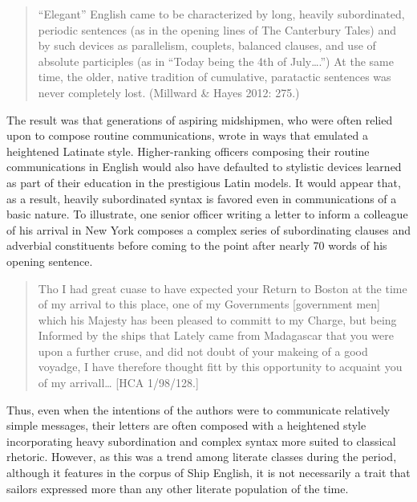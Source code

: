 \begin{quotation}
“Elegant” English came to be characterized by long, heavily subordinated, periodic sentences (as in the opening lines of The Canterbury Tales) and by such devices as parallelism, couplets, balanced clauses, and use of absolute participles (as in “Today being the 4th of July….”) At the same time, the older, native tradition of cumulative, paratactic sentences was never completely lost. (Millward \& Hayes 2012: 275.)

\end{quotation}
\begin{styleStandard}
The result was that generations of aspiring midshipmen, who were often relied upon to compose routine communications, wrote in ways that emulated a heightened Latinate style. Higher-ranking officers composing their routine communications in English would also have defaulted to stylistic devices learned as part of their education in the prestigious Latin models. It would appear that, as a result, heavily subordinated syntax is favored even in communications of a basic nature. To illustrate, one senior officer writing a letter to inform a colleague of his arrival in New York composes a complex series of subordinating clauses and adverbial constituents before coming to the point after nearly 70 words of his opening sentence.
\end{styleStandard}


\begin{quotation}
Tho I had great cuase to have expected your Return to Boston at the time of my arrival to this place, one of my Governments [government men] which his Majesty has been pleased to committ to my Charge, but being Informed by the ships that Lately came from Madagascar that you were upon a further cruse, and did not doubt of your makeing of a good voyadge, I have therefore thought fitt by this opportunity to acquaint you of my arrivall… [HCA 1/98/128.]

\end{quotation}
\begin{styleStandard}
Thus, even when the intentions of the authors were to communicate relatively simple messages, their letters are often composed with a heightened style incorporating heavy subordination and complex syntax more suited to classical rhetoric. However, as this was a trend among literate classes during the period, although it features in the corpus of Ship English, it is not necessarily a trait that sailors expressed more than any other literate population of the time. 
\end{styleStandard}



